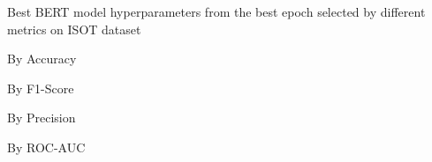 \begin{table}[!htbp]
    \caption{Best BERT model hyperparameters from the best epoch selected by different metrics on ISOT dataset}
    \label{tab:isot_bert_hparams}
    \centering

    \begin{subtable}[t]{0.48\linewidth}
        \scriptsize
        \caption{By Accuracy}
        
    \end{subtable}
    \hfill
    \begin{subtable}[t]{0.48\linewidth}
        \scriptsize
        \caption{By F1-Score}
        
    \end{subtable}

    \vspace{1em}

    \begin{subtable}[t]{0.48\linewidth}
        \scriptsize
        \caption{By Precision}
        
    \end{subtable}
    \hfill
    \begin{subtable}[t]{0.48\linewidth}
        \scriptsize
        \caption{By ROC-AUC}
        
    \end{subtable}


\end{table}